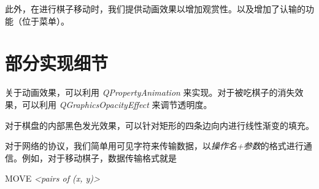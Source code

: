 \documentclass[11pt,a4paper]{article}
\begin{document}
此外，在进行棋子移动时，我们提供动画效果以增加观赏性。以及增加了认输的功能（位于菜单）。

\section{部分实现细节}
关于动画效果，可以利用 {\it QPropertyAnimation} 来实现。对于被吃棋子的消失效果，可以利用 {\it QGraphicsOpacityEffect} 来调节透明度。

对于棋盘的内部黑色发光效果，可以针对矩形的四条边向内进行线性渐变的填充。

对于网络的协议，我们简单用可见字符来传输数据，以{\it 操作名+参数}的格式进行通信。例如，对于移动棋子，数据传输格式就是
\begin{center}
	MOVE {\it <length of moving trace> <pairs of (x, y)>}
\end{center}
\end{document}
